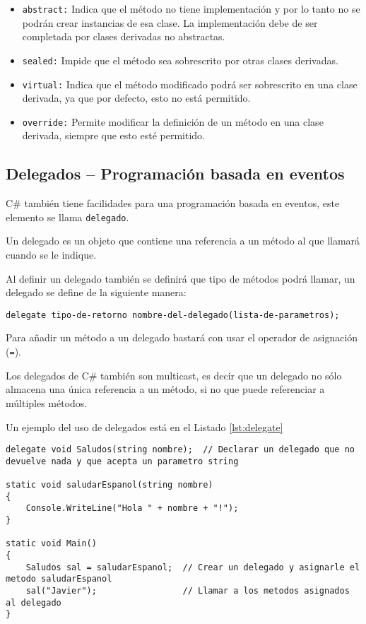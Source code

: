 \documentclass{pre-tfg}
\begin{document}
\begin{itemize}
	\item \texttt{abstract:} Indica que el método no tiene implementación y por lo tanto no se podrán crear instancias de esa clase. La implementación debe de ser completada por clases derivadas no abstractas.
	\item \texttt{sealed:} Impide que el método sea sobrescrito por otras clases derivadas.
	\item \texttt{virtual:} Indica que el método modificado podrá ser sobrescrito en una clase derivada, ya que por defecto, esto no está permitido.
	\item \texttt{override:} Permite modificar la definición de un método en una clase derivada, siempre que esto esté permitido.
\end{itemize}



\subsection{Delegados -- Programación basada en eventos}

C\# también tiene facilidades para una programación basada en eventos, este elemento se llama \texttt{delegado}.

Un delegado es un objeto que contiene una referencia a un método al que llamará cuando se le indique.

Al definir un delegado también se definirá que tipo de métodos podrá llamar, un delegado se define de la siguiente manera:

\begin{spacing}{1}
\begin{lstlisting}[float=htbp, caption=Estructura de un delegado]
delegate tipo-de-retorno nombre-del-delegado(lista-de-parametros);
\end{lstlisting}
\end{spacing}

Para añadir un método a un delegado bastará con usar el operador de asignación (\texttt{=}).

Los delegados de C\# también son multicast, es decir que un delegado no sólo almacena una única referencia a un método, si no que puede referenciar a múltiples métodos.

Un ejemplo del uso de delegados está en el Listado \ref{lst:delegate}

\begin{spacing}{1}
\begin{lstlisting}[float=htbp, caption={Ejemplo de uso de delegados unicast}, label=lst:delegate]
delegate void Saludos(string nombre);  // Declarar un delegado que no devuelve nada y que acepta un parametro string

static void saludarEspanol(string nombre)
{
	Console.WriteLine("Hola " + nombre + "!");
}

static void Main()
{
	Saludos sal = saludarEspanol;  // Crear un delegado y asignarle el metodo saludarEspanol
	sal("Javier");                 // Llamar a los metodos asignados al delegado
}
\end{lstlisting}
\end{spacing}
\end{document}
